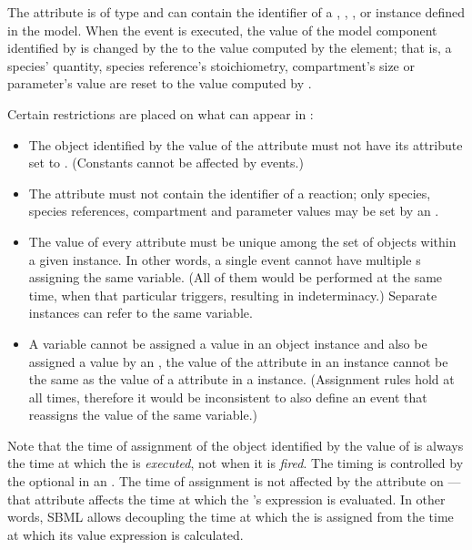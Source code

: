 The  attribute is of type  and can
contain the identifier of a \Compartment, \Species, \SpeciesReference,
or \Parameter instance defined in the model.  
When the event is executed, the value of
the model component identified by  is changed by
the \EventAssignment to the value computed by the 
element; that is, a species' quantity, species reference's stoichiometry, 
compartment's size or parameter's value are reset to the value 
computed by .

Certain restrictions are placed on what can appear in
:
\begin{itemize}
  
\item The object identified by the value of the 
  attribute must not have its  attribute set 
  to .  (Constants cannot be affected by events.)
  
\item The  attribute must not contain the
  identifier of a reaction; only species, species references,
  compartment and parameter values may be set by an \Event.
  
\item The value of every  attribute must be unique
  among the set of \EventAssignment objects within a given
  \Event instance.  In other words, a single event cannot have
  multiple \EventAssignment{}s assigning the same variable.  (All
  of them would be performed at the same time, when that
  particular \Event triggers, resulting in indeterminacy.)
  Separate \Event instances can refer to the same variable.
  
\item A variable cannot be assigned a value in an \EventAssignment
  object instance and also be assigned a value by an
  \AssignmentRule, \ie the value of the  attribute
  in an \EventAssignment instance cannot be the same as the value
  of a  attribute in a \AssignmentRule instance.
  (Assignment rules hold at all times, therefore it would be
  inconsistent to also define an event that reassigns the value of
  the same variable.)

\end{itemize}



Note that the time of assignment of the object identified by the
value of  is always the time at which the \Event
is \emph{executed}, not when it is \emph{fired}.  The timing is
controlled by the optional \Delay in an \Event.  The time of
assignment is not affected by the 
attribute on \Event---that attribute affects the time at which the
\EventAssignment's  expression is evaluated.  In other
words, SBML allows decoupling the time at which the
 is assigned from the time at which its value
expression is calculated.




